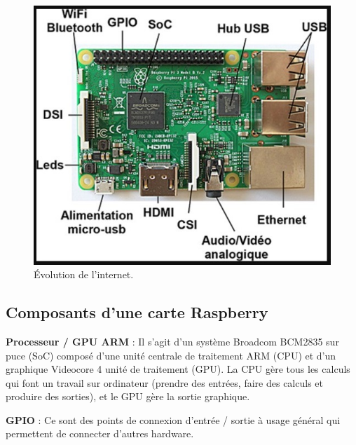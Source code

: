 \documentclass[12pt,a4paper]{report}
\begin{document}
\noindent \begin{flushleft}
	
	
		\begin{figure}[H]
		\centering
		\includegraphics[width=0.8\linewidth]{image33}
		\caption{Évolution de l'internet.}
		
		\end{figure}
	
\end{flushleft}

\subsection{Composants d'une carte Raspberry}

\noindent \textbf{Processeur / GPU ARM }: Il s'agit d'un syst\`{e}me Broadcom BCM2835 sur puce (SoC) compos\'{e} d'une unit\'{e} centrale de traitement ARM (CPU) et d'un graphique Videocore 4 unit\'{e} de traitement (GPU). La CPU g\`{e}re tous les calculs qui font un travail sur ordinateur (prendre des entr\'{e}es, faire des calculs et produire des sorties), et le GPU g\`{e}re la sortie graphique.

\noindent \begin{flushleft}
	
\end{flushleft}

\noindent \textbf{GPIO }: Ce sont des points de connexion d'entr\'{e}e / sortie \`{a} usage g\'{e}n\'{e}ral qui permettent de connecter d'autres hardware.

\noindent \begin{flushleft}
	
\end{flushleft}
\end{document}
